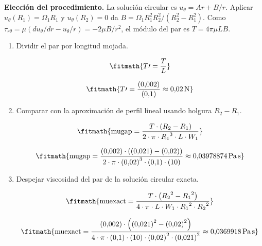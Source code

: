 \noindent\textbf{Elección del procedimiento.} La solución circular es $u_\theta=Ar+B/r$. Aplicar $u_\theta(R_1)=\Omega_1R_1$ y $u_\theta(R_2)=0$ da $B=\Omega_1R_1^2R_2^2/(R_2^2-R_1^2)$. Como $\tau_{r\theta}=\mu(du_\theta/dr-u_\theta/r)=-2\mu B/r^2$, el módulo del par es $T=4\pi\mu LB$.

\begin{enumerate}

\item Dividir el par por longitud mojada.

\[\fitmath{T\prime=\frac{T}{L}}\]

\[\fitmath{T\prime=\frac{(0{,}002)}{(0{,}1)}\approx 0{,}02\,\mathrm{N}}\]

\item Comparar con la aproximación de perfil lineal usando holgura $R_2-R_1$.

\[\fitmath{\mathrm{mugap}=\frac{T\cdot \left(R_{2}-R_{1}\right)}{2\cdot \pi\cdot {R_{1}}^{3}\cdot L\cdot W_{1}}}\]

\[\fitmath{\mathrm{mugap}=\frac{(0{,}002)\cdot \left((0{,}021)-(0{,}02)\right)}{2\cdot \pi\cdot {(0{,}02)}^{3}\cdot (0{,}1)\cdot (10)}\approx 0{,}03978874\,\mathrm{Pa\,s}}\]

\item Despejar viscosidad del par de la solución circular exacta.

\[\fitmath{\mathrm{muexact}=\frac{T\cdot \left({R_{2}}^{2}-{R_{1}}^{2}\right)}{4\cdot \pi\cdot L\cdot W_{1}\cdot {R_{1}}^{2}\cdot {R_{2}}^{2}}}\]

\[\fitmath{\mathrm{muexact}=\frac{(0{,}002)\cdot \left({(0{,}021)}^{2}-{(0{,}02)}^{2}\right)}{4\cdot \pi\cdot (0{,}1)\cdot (10)\cdot {(0{,}02)}^{2}\cdot {(0{,}021)}^{2}}\approx 0{,}0369918\,\mathrm{Pa\,s}}\]

\end{enumerate}
